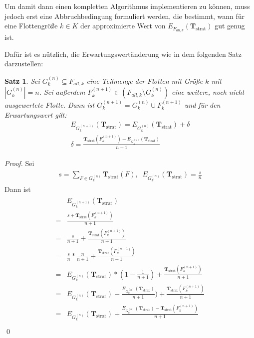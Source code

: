 \documentclass[a4paper,12pt]{llncs}
\numberwithin{equation}{section}
\newtheorem{satz}{Satz}
\DeclareMathOperator{\strat}{strat}
\begin{document}
Um damit dann einen kompletten Algorithmus implementieren zu können, muss jedoch erst eine Abbruchbedingung formuliert werden, die bestimmt, wann für eine Flottengröße $k \in K$ der approximierte Wert von $E_{F_{all,k}}(\mathbf{T}_{\strat})$ gut genug ist.

Dafür ist es nützlich, die Erwartungswertänderung wie in dem folgenden Satz darzustellen:

\begin{satz}
Sei $G_k^{(n)} \subseteq F_{all,k}$ eine Teilmenge der Flotten mit Größe $k$ mit $|G_k^{(n)}|=n$.
Sei außerdem $F_k^{(n+1)} \in (F_{all,k} \setminus G_k^{(n)})$ eine weitere, noch nicht ausgewertete Flotte.
Dann ist $G_k^{(n+1)}=G_k^{(n)} \cup F_k^{(n+1)}$ und für den Erwartungswert gilt:
\begin{align}
E_{G_k^{(n+1)}}(\mathbf{T}_{\strat})=E_{G_k^{(n)}}(\mathbf{T}_{\strat}) + \delta\\
 \delta=\frac{\mathbf{T}_{\strat}(F_k^{(n+1)}) - E_{G_k^{(n)}}(\mathbf{T}_{\strat})}{n+1}
\nonumber
\end{align}
\end{satz}

\begin{proof}
Sei
\begin{align}
\begin{split}
s=\sum_{F \in G_k^{(n)}} \mathbf{T}_{\strat}(F),\;\; E_{G_k^{(n)}}(\mathbf{T}_{\strat}) =\frac{s}{n}
\end{split}
\end{align}
Dann ist
\begin{align}
\begin{split}
&E_{G_k^{(n+1)}}(\mathbf{T}_{\strat})\\
=&\frac{s+ \mathbf{T}_{\strat}(F_k^{(n+1)}) }{n + 1}\\
=&\frac{s}{n + 1} + \frac{\mathbf{T}_{\strat}(F_k^{(n+1)}) }{n + 1}\\
=&\frac{s}{n} * \frac{n}{n + 1} + \frac{\mathbf{T}_{\strat}(F_k^{(n+1)}) }{n + 1}\\
=&E_{G_k^{(n)}}(\mathbf{T}_{\strat}) * (1 - \frac{1}{n + 1}) + \frac{\mathbf{T}_{\strat}(F_k^{(n+1)}) }{n + 1}\\
=&E_{G_k^{(n)}}(\mathbf{T}_{\strat}) - \frac{E_{G_k^{(n)}}(\mathbf{T}_{\strat})}{n + 1}) + \frac{\mathbf{T}_{\strat}(F_k^{(n+1)}) }{n + 1}\\
=&E_{G_k^{(n)}}(\mathbf{T}_{\strat}) + \frac{E_{G_k^{(n)}}(\mathbf{T}_{\strat}) - \mathbf{T}_{\strat}(F_k^{(n+1)}) }{n + 1}\\
\end{split}
\end{align}
\qed
\end{proof}
\end{document}
